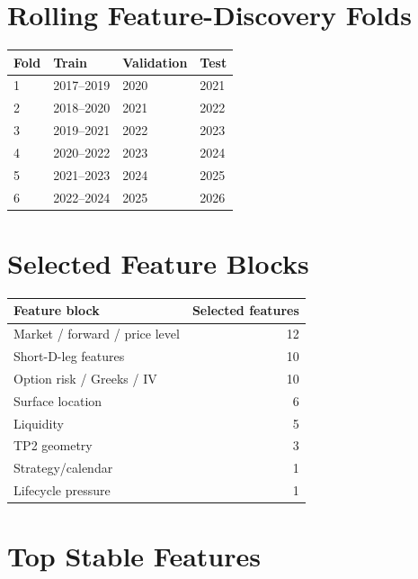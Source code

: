 \documentclass[11pt]{article}
\begin{document}
\section*{Rolling Feature-Discovery Folds}

\begin{center}
\begin{tabular}{llll}
\toprule
Fold & Train & Validation & Test \\
\midrule
1 & 2017--2019 & 2020 & 2021 \\
2 & 2018--2020 & 2021 & 2022 \\
3 & 2019--2021 & 2022 & 2023 \\
4 & 2020--2022 & 2023 & 2024 \\
5 & 2021--2023 & 2024 & 2025 \\
6 & 2022--2024 & 2025 & 2026 \\
\bottomrule
\end{tabular}
\end{center}

\section*{Selected Feature Blocks}

\begin{center}
\begin{tabular}{lr}
\toprule
Feature block & Selected features \\
\midrule
Market / forward / price level & 12 \\
Short-D-leg features & 10 \\
Option risk / Greeks / IV & 10 \\
Surface location & 6 \\
Liquidity & 5 \\
TP2 geometry & 3 \\
Strategy/calendar & 1 \\
Lifecycle pressure & 1 \\
\bottomrule
\end{tabular}
\end{center}

\section*{Top Stable Features}
\end{document}
